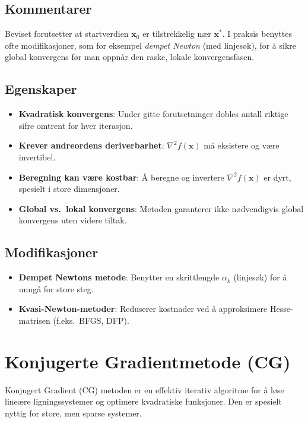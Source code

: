 \subsection{Kommentarer}
Beviset forutsetter at startverdien \(\symbf{x}_0\) er tilstrekkelig nær \(\symbf{x}^*\). I praksis benyttes ofte modifikasjoner, som for eksempel \textit{dempet Newton} (med linjesøk), for å sikre global konvergens før man oppnår den raske, lokale konvergensfasen.

\subsection{Egenskaper}
\begin{itemize}
  \item \textbf{Kvadratisk konvergens}: Under gitte forutsetninger dobles antall riktige sifre omtrent for hver iterasjon.
  \item \textbf{Krever andreordens deriverbarhet}: \(\nabla^2 f(\symbf{x})\) må eksistere og være invertibel.
  \item \textbf{Beregning kan være kostbar}: Å beregne og invertere \(\nabla^2 f(\symbf{x})\) er dyrt, spesielt i store dimensjoner.
  \item \textbf{Global vs.\ lokal konvergens}: Metoden garanterer ikke nødvendigvis global konvergens uten videre tiltak.
\end{itemize}

\subsection{Modifikasjoner}
\begin{itemize}
  \item \textbf{Dempet Newtons metode}: Benytter en skrittlengde \(\alpha_k\) (linjesøk) for å unngå for store steg.
  \item \textbf{Kvasi-Newton-metoder}: Reduserer kostnader ved å approksimere Hesse-matrisen (f.eks.\ BFGS, DFP).
\end{itemize}


\section{Konjugerte Gradientmetode (CG)}\label{sec:conjugate_gradient}

Konjugert Gradient (CG) metoden er en effektiv iterativ algoritme for å løse lineære ligningssystemer og optimere kvadratiske funksjoner. Den er spesielt nyttig for store, men sparse systemer.

